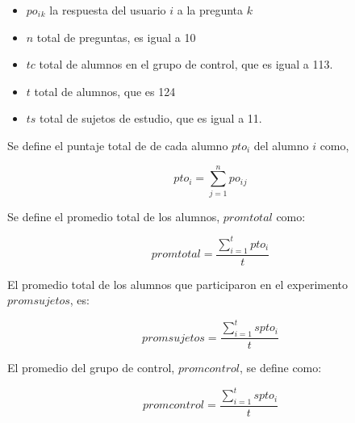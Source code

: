 \begin{itemize}
    \item $po_i{_k}$ la respuesta del usuario $i$ a la pregunta $k$
    \item $n$ total de preguntas, es igual a 10
    \item $tc$ total de alumnos en el grupo de control, que es igual a 113.
    \item $t$ total de alumnos, que es 124
    \item $ts$ total de sujetos de estudio, que es igual a 11.
\end{itemize}

Se define el puntaje total de de cada alumno $pto_i$ del alumno $i$ como, 

\begin{equation*}
    pto_i = \sum_{j=1}^n{po_i{_j}}
\end{equation*}

Se define el promedio total de los alumnos, $promtotal$ como:

\begin{equation*}
    promtotal = \frac{\sum_{i=1}^t{pto_i}}{t}
\end{equation*}

El promedio total de los alumnos que participaron en el experimento
$promsujetos$, es:

\begin{equation*}
    promsujetos = \frac{\sum_{i=1}^ts{pto_i}}{t}
\end{equation*}

El promedio del grupo de control, $promcontrol$, se define como:

\begin{equation*}
    promcontrol = \frac{\sum_{i=1}^ts{pto_i}}{t}
\end{equation*}



